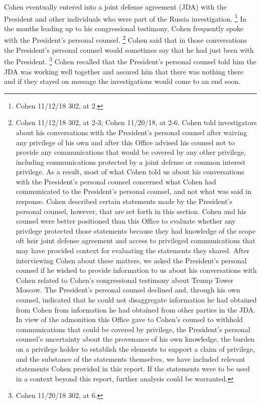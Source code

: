 Cohen eventually entered into a joint defense agreement (JDA) with the President and other individuals who were part of the Russia investigation.%
\footnote{Cohen 11/12/18 302, at 2.}
In the months leading up to his congressional testimony, Cohen frequently spoke with the President's personal counsel.%
\footnote{Cohen 11/12/18 302, at 2-3;
Cohen 11/20/18, at 2-6.
Cohen told investigators about his conversations with the President’s personal counsel after waiving any privilege of his own and after this Office advised his counsel not to provide any communications that would be covered by any other privilege, including communications protected by a joint defense or common interest privilege.
As a result, most of what Cohen told us about his conversations with the President’s personal counsel concerned what Cohen had communicated to the President’s personal counsel, and not what was said in response.
Cohen described certain statements made by the President’s personal counsel, however, that are set forth in this section.
Cohen and his counsel were better positioned than this Office to evaluate whether any privilege protected those statements because they had knowledge of the scope oft heir joint defense agreement and access to privileged communications that may have provided context for evaluating the statements they shared.
After interviewing Cohen about these matters, we asked the President’s personal counsel if he wished to provide information to us about his conversations with Cohen related to Cohen’s congressional testimony about Trump Tower Moscow.
The President’s personal counsel declined and, through his own counsel, indicated that he could not disaggregate information he had obtained from Cohen from information he had obtained from other parties in the JDA.
In view of the admonition this Office gave to Cohen’s counsel to withhold communications that could be covered by privilege, the President’s personal counsel’s uncertainty about the provenance of his own knowledge, the burden on a privilege holder to establish the elements to support a claim of privilege, and the substance of the statements themselves, we have included relevant statements Cohen provided in this report.
If the statements were to be used in a context beyond this report, further analysis could be warranted.}
Cohen said that in those conversations the President's personal counsel would sometimes say that he had just been with the President.%
\footnote{Cohen 11/20/18 302, at 6.}
Cohen recalled that the President's personal counsel told him the JDA was working well together and assured him that there was nothing there and if they stayed on message the investigations would come to an end soon.%
